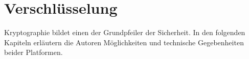 \section{Verschlüsselung}
	Kryptographie bildet einen der Grundpfeiler der Sicherheit. In den folgenden
	Kapiteln erläutern die Autoren Möglichkeiten und technische Gegebenheiten
	beider Platformen. 
